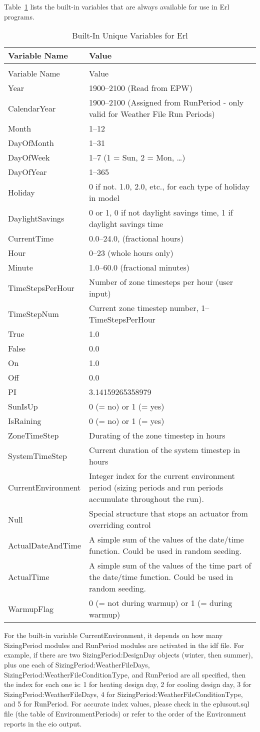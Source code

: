 Table~\ref{table:built-in-unique-variables-for-erl} lists the built-in variables that are always available for use in Erl programs.

\begin{longtable}[c]{p{1.5in}p{4.5in}}
\caption{Built-In Unique Variables for Erl \label{table:built-in-unique-variables-for-erl}} \tabularnewline
\toprule 
Variable Name & Value \tabularnewline
\midrule
\endfirsthead

\caption[]{Built-In Unique Variables for Erl} \tabularnewline
\toprule 
Variable Name & Value \tabularnewline
\midrule
\endhead

Year & 1900--2100 (Read from EPW) \tabularnewline
CalendarYear & 1900--2100 (Assigned from RunPeriod - only valid for Weather File Run Periods) \tabularnewline
Month & 1--12 \tabularnewline
DayOfMonth & 1--31 \tabularnewline
DayOfWeek & 1--7 (1 = Sun, 2 = Mon, \ldots) \tabularnewline
DayOfYear & 1--365 \tabularnewline
Holiday & 0 if not. 1.0, 2.0, etc., for each type of holiday in model \tabularnewline
DaylightSavings & 0 or 1, 0 if not daylight savings time, 1 if daylight savings time \tabularnewline
CurrentTime & 0.0--24.0, (fractional hours) \tabularnewline
Hour & 0--23 (whole hours only) \tabularnewline
Minute & 1.0--60.0 (fractional minutes) \tabularnewline
TimeStepsPerHour & Number of zone timesteps per hour (user input) \tabularnewline
TimeStepNum & Current zone timestep number, 1--TimeStepsPerHour \tabularnewline
True & 1.0 \tabularnewline
False & 0.0 \tabularnewline
On & 1.0 \tabularnewline
Off & 0.0 \tabularnewline
PI & 3.14159265358979 \tabularnewline
SunIsUp & 0 (= no) or 1 (= yes) \tabularnewline
IsRaining & 0 (= no) or 1 (= yes) \tabularnewline
ZoneTimeStep & Durating of the zone timestep in hours \tabularnewline
SystemTimeStep & Current duration of the system timestep in hours \tabularnewline
CurrentEnvironment & Integer index for the current environment period (sizing periods and run periods accumulate throughout the run). \tabularnewline
Null & Special structure that stops an actuator from overriding control \tabularnewline
ActualDateAndTime & A simple sum of the values of the date/time function. Could be used in random seeding. \tabularnewline
ActualTime & A simple sum of the values of the time part of the date/time function. Could be used in random seeding. \tabularnewline
WarmupFlag & 0 (= not during warmup) or 1 (= during warmup) \tabularnewline
\bottomrule
\end{longtable}

For the built-in variable CurrentEnvironment, it depends on how many SizingPeriod modules and RunPeriod modules are activated in the idf file. For example, if there are two SizingPeriod:DesignDay objects (winter, then summer), plus one each of SizingPeriod:WeatherFileDays, SizingPeriod:WeatherFileConditionType, and RunPeriod are all specified, then the index for each one is: 1 for heating design day, 2 for cooling design day, 3 for SizingPeriod:WeatherFileDays, 4 for SizingPeriod:WeatherFileConditionType, and 5 for RunPeriod. For accurate index values, please check in the eplusout.sql file (the table of EnvironmentPeriods) or refer to the order of the Environment reports in the eio output. 

